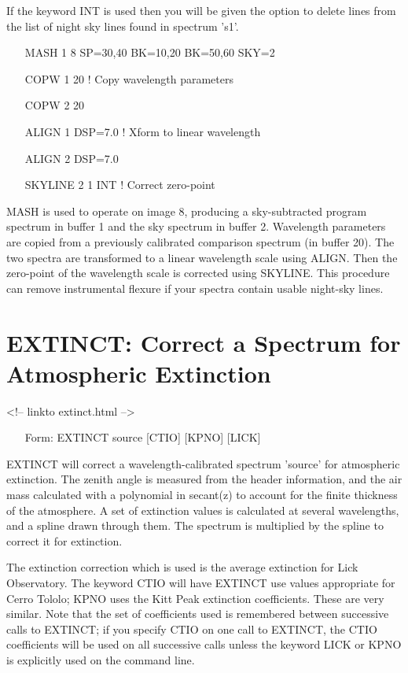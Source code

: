 If the keyword INT is used then you will be given the option to delete
lines from the list of night sky lines found in spectrum 's1'.

\begin{itemize}
  \item[MASH 1 8 SP=30,40 BK=10,20 BK=50,60 SKY=2\hfill]{}
  \item[COPW 1 20\hfill]{! Copy wavelength parameters}
  \item[COPW 2 20\hfill]{}
  \item[ALIGN 1 DSP=7.0\hfill]{! Xform to linear wavelength}
  \item[ALIGN 2 DSP=7.0\hfill]{}
  \item[SKYLINE 2 1 INT\hfill]{! Correct zero-point}
\end{itemize}
MASH is used to operate on image 8, producing a sky-subtracted program
spectrum in buffer 1 and the sky spectrum in buffer 2.  Wavelength
parameters are copied from a previously calibrated comparison spectrum (in
buffer 20). The two spectra are transformed to a linear wavelength scale
using ALIGN. Then the zero-point of the wavelength scale is corrected using
SKYLINE.  This procedure can remove instrumental flexure if your spectra
contain usable night-sky lines.

\section{EXTINCT: Correct a Spectrum for Atmospheric Extinction}
\begin{rawhtml}
<!-- linkto extinct.html -->
\end{rawhtml}
\begin{itemize}
  \item[Form: EXTINCT source {[CTIO]} {[KPNO]} {[LICK]}\hfill]{}
\end{itemize}

EXTINCT will correct a wavelength-calibrated spectrum 'source' for
atmospheric extinction.  The zenith angle is measured from the header
information, and the air mass calculated with a polynomial in secant(z) to
account for the finite thickness of the atmosphere.  A set of extinction
values is calculated at several wavelengths, and a spline drawn through
them.  The spectrum is multiplied by the spline to correct it for
extinction.

The extinction correction which is used is the average extinction for Lick
Observatory.  The keyword CTIO will have EXTINCT use values appropriate for
Cerro Tololo; KPNO uses the Kitt Peak extinction coefficients.  These are
very similar. Note that the set of coefficients used is remembered between
successive calls to EXTINCT; if you specify CTIO on one call to EXTINCT,
the CTIO coefficients will be used on all successive calls unless the
keyword LICK or KPNO is explicitly used on the command line.


